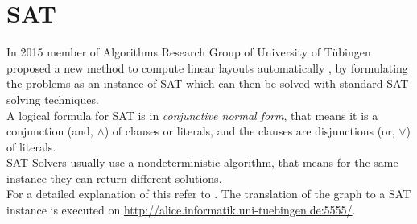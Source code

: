 \section{SAT}
\label{SAT}
In 2015 member of Algorithms Research Group of University of Tübingen proposed a new method to compute linear layouts automatically \cite{Bekos2015TheBE}, by formulating the problems as an instance of SAT which can then be solved with standard SAT solving techniques.\\
A logical formula for SAT is in \textit{conjunctive normal form}, that means it is a conjunction (and, $\land$) of clauses or literals, and the clauses are disjunctions (or, $\lor$) of literals.\\
SAT-Solvers usually use a nondeterministic algorithm, that means for the same instance they can return different solutions.\\
For a detailed explanation of this refer to \cite{Bekos2015TheBE, jess}. The translation of the graph to a SAT instance is executed on \url{
http://alice.informatik.uni-tuebingen.de:5555/}.
